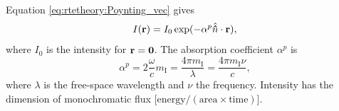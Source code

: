 Equation \ref{eq:rtetheory:Poynting_vec} gives
\begin{equation}
  I(\mathbf{r}) = I_0 \exp(-\alpha^p \hat{{\bf \hat{n}}} \cdot \mathbf{r}),
\end{equation}
where $I_0$ is the intensity for $\mathbf{r} = \mathbf{0}$. The absorption
coefficient $\alpha^p$ is
\begin{equation}
  \alpha^p =
  2 \frac{\omega}{c} m_{\mathrm{I}} =
    \frac{4\pi m_{\mathrm{I}}}{\lambda} =
    \frac{4\pi m_{\mathrm{I}}\nu}{c},
\end{equation}
where $\lambda$ is the free-space wavelength and $\nu$ the frequency.
Intensity has the dimension of monochromatic flux
[$\mathrm{energy}/(\mathrm{area}\times\mathrm{time})$].
  



